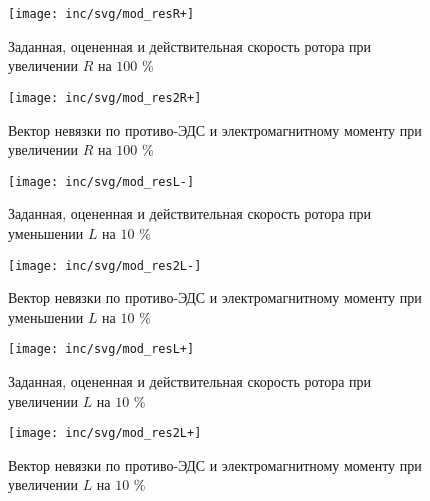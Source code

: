 \begin{figure}[!h]
\centering
\texttt{[image: inc/svg/mod\_resR+]}
\caption{Заданная, оцененная и действительная скорость ротора при увеличении $R$ на $100$ \%}
\label{pic:R+}
\end{figure}

\begin{figure}[!h]
\centering
\texttt{[image: inc/svg/mod\_res2R+]}
\caption{Вектор невязки по противо-ЭДС и электромагнитному моменту при увеличении $R$ на $100$ \%}
\label{pic:2R+}
\end{figure}

\begin{figure}[!h]
\centering
\texttt{[image: inc/svg/mod\_resL-]}
\caption{Заданная, оцененная и действительная скорость ротора при уменьшении $L$ на $10$ \%}
\label{pic:L-}
\end{figure}

\begin{figure}[!h]
\centering
\texttt{[image: inc/svg/mod\_res2L-]}
\caption{Вектор невязки по противо-ЭДС и электромагнитному моменту при уменьшении $L$ на $10$ \%}
\label{pic:2L-}
\end{figure}

\begin{figure}[!h]
\centering
\texttt{[image: inc/svg/mod\_resL+]}
\caption{Заданная, оцененная и действительная скорость ротора при увеличении $L$ на $10$ \%}
\label{pic:L+}
\end{figure}

\begin{figure}[!h]
\centering
\texttt{[image: inc/svg/mod\_res2L+]}
\caption{Вектор невязки по противо-ЭДС и электромагнитному моменту при увеличении $L$ на $10$ \%}
\label{pic:2L+}
\end{figure}
